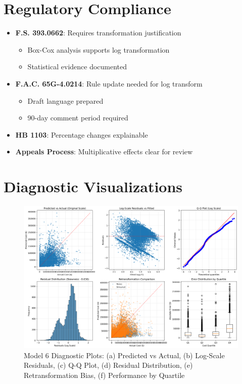 \section{Regulatory Compliance}

\begin{itemize}
    \item \textbf{F.S. 393.0662}: Requires transformation justification
    \begin{itemize}
        \item Box-Cox analysis supports log transformation
        \item Statistical evidence documented
    \end{itemize}
    \item \textbf{F.A.C. 65G-4.0214}: Rule update needed for log transform
    \begin{itemize}
        \item Draft language prepared
        \item 90-day comment period required
    \end{itemize}
    \item \textbf{HB 1103}: Percentage changes explainable
    \item \textbf{Appeals Process}: Multiplicative effects clear for review
\end{itemize}

\section{Diagnostic Visualizations}

\begin{figure}[h]
    \centering
    \includegraphics[width=\textwidth]{models/model_6/diagnostic_plots.png}
    \caption{Model 6 Diagnostic Plots: (a) Predicted vs Actual, (b) Log-Scale Residuals, (c) Q-Q Plot, (d) Residual Distribution, (e) Retransformation Bias, (f) Performance by Quartile}
    \label{fig:model6_diagnostics}
\end{figure}

